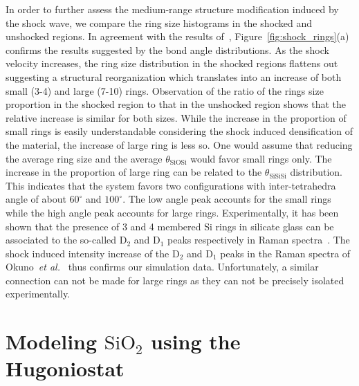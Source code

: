 \documentclass[aps,10pt,twocolumn]{revtex4}
\makeatletter
\newcommand{\etal}{\emph{et al.}\@\xspace}
\newcommand{\mrm}[1]{\ensuremath{\mathrm{#1}}\xspace}
\newcommand{\SiOTwo}{\ensuremath{\mrm{SiO_2}}\xspace}
\makeatother
\begin{document}
In order to further assess the medium-range structure modification induced by the shock wave, we
compare the ring size histograms in the shocked and unshocked regions.
In agreement with the results of~\cite{KubotaCaturla01}, Figure~\ref{fig:shock_rings}(a)
confirms the results suggested by the bond angle distributions. 
As the shock velocity increases, the ring size distribution in the shocked regions flattens out
suggesting a structural reorganization which translates into an increase of both small (3-4) and
large (7-10) rings. Observation of the ratio of the rings size proportion in the shocked region
to that in the unshocked region shows that the relative increase is similar for both sizes.
While the increase in the proportion of small rings is easily understandable considering the
shock induced densification of the material, the increase of large ring is less so. One would
assume that reducing the average ring size and the average $\theta_\mrm{SiOSi}$ would favor
small rings only. The increase in the proportion of large ring can be related to
the $\theta_\mrm{SiSiSi}$ distribution. This indicates that the system favors two
configurations with inter-tetrahedra angle of  about $60^\circ$ and $100^\circ$. The low angle
peak accounts for the small rings while the high angle peak accounts for large rings.
Experimentally, it has been shown that the presence of 3 and 4 membered Si rings in silicate
glass can be associated to the so-called \mrm{D_2} and \mrm{D_1} peaks respectively in Raman
spectra~\cite{PasquarelloCar98}. The shock induced intensity increase of the \mrm{D_2} and \mrm{D_1} peaks in
the Raman spectra of Okuno~\etal~\cite{OkunoReynard99} thus confirms our simulation data.
Unfortunately, a similar connection can not be made for large rings as they can not be precisely
isolated experimentally.

\section{Modeling \SiOTwo using the Hugoniostat}
\label{s:hug}
\end{document}

